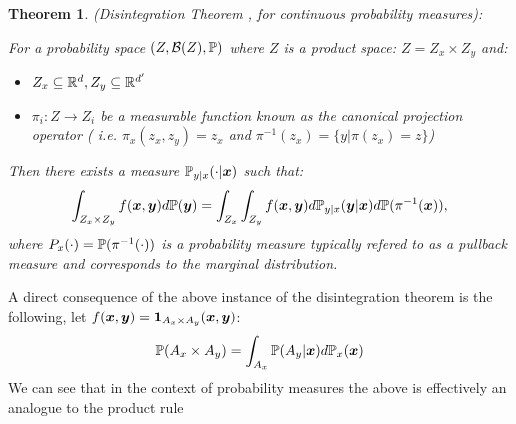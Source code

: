 \documentclass[a4paper,12pt,twoside,openright]{report}
\newtheorem{theorem}{Theorem}
\theoremstyle{definition}
\begin{document}
\begin{theorem} (Disintegration Theorem , for continuous probability measures): 

For a probability space $(Z, \calB(Z) ,\P)$ where $Z$ is a product space: $Z = Z_x \times Z_y$ and:
\begin{itemize}
    \item  $Z_x \subseteq \R^d, Z_y \subseteq \R^{d'}$
    \item  $\pi_i: Z \rightarrow Z_i$ be a measurable function known as the canonical projection operator ( i.e. $\pi_x(z_x,z_y) = z_x$ and $\pi^{-1}(z_x) = \{y | \pi(z_x) = z\}$)
\end{itemize}
Then there exists a measure $\P_{y|x}(\cdot | \vx)$ such that:
  \begin{align}
      \int_{Z_x \times Z_y} f(\vx, \vy) d\P(\vy) = \int_{Z_x}\int_{Z_y} f(\vx,\vy) d\P_{y|x}(\vy | \vx) d\P(\pi^{-1}(\vx)),
  \end{align}
 where $P_x(\cdot) = \P(\pi^{-1}(\cdot))$  is a probability measure typically refered to as a pullback measure and corresponds to the marginal distribution.
\end{theorem}

A direct consequence of the above instance of the disintegration theorem is the following, let $f(\vx,\vy) = \ind_{A_x \times A_y}(\vx,\vy)$:
\begin{align}
    \P(A_x \times A_y) = \int_{A_x}\P(A_y | \vx) d\P_x(\vx) 
\end{align}
 We can see that in the context of probability measures the above is effectively an analogue to the product rule 
\end{document}
